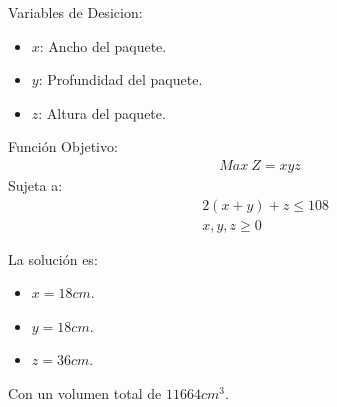 \begin{homeworkProblem}[-1][Paquete]
Variables de Desicion:
\begin{itemize}
    \item $x$: Ancho del paquete.
    \item $y$: Profundidad del paquete.
    \item $z$: Altura del paquete.
\end{itemize}
Función Objetivo:
\begin{align*}
    Max\ Z = xyz
\end{align*}
Sujeta a:
\begin{align*}
    &2(x+y)+z\leq 108 \\
    &x,y,z\geq0
\end{align*}

La solución es:
\begin{itemize}
    \item $x=18cm$.
    \item $y=18cm$.
    \item $z=36cm$.
\end{itemize}
Con un volumen total de $11664cm^3$.
\end{homeworkProblem}